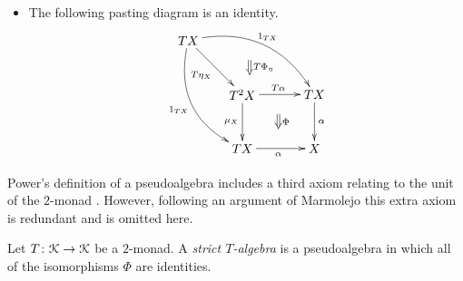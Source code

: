 \begin{Defi}
\begin{itemize}
    \item The following pasting diagram is an identity.
    \[
        \xy
            (0,0)*+{TX}="txl1";
            (15,-15)*+{T^2X}="t2x";
            (15,-30)*+{TX}="txl2";
            (35,-15)*+{TX}="txl3";
            (35,-30)*+{X}="xl";
            {\ar@/^1.7pc/^{1_{TX}} "txl1" ; "txl3"};
            {\ar@/_1.7pc/_{1_{TX}} "txl1" ; "txl2"};
            {\ar_{T\eta_X} "txl1" ; "t2x"};
            {\ar^{T\alpha} "t2x" ; "txl3"};
            {\ar_{\mu_X} "t2x" ; "txl2"};
            {\ar_{\alpha} "txl2" ; "xl"};
            {\ar^{\alpha} "txl3" ; "xl"};
            {\ar@{=>}^{T\Phi_\eta} (17,-5.5) ; (17,-9.5)};
            {\ar@{=>}^{\Phi} (25,-20.5) ; (25,-24.5)};
        \endxy
    \]

    \end{itemize}
\end{Defi}

Power's definition of a pseudoalgebra includes a third axiom relating to the unit of the $2$-monad \cite[Definition 2.4, Axiom 2.1]{power-gen}. However, following an argument of Marmolejo \cite[Lemma 9.1]{marm-doct} this extra axiom is redundant and is omitted here.

\begin{Defi}\label{Defi:strictalgebra}
Let $T \colon \mathcal{K} \rightarrow \mathcal{K}$ be a $2$-monad. A \textit{strict $T$-algebra} is a pseudoalgebra in which all of the isomorphisms $\Phi$ are identities.
\end{Defi}

